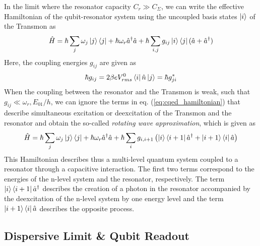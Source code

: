  In the limit where the resonator capacity $C_r \gg C_\Sigma$, we can write the effective Hamiltonian of the qubit-resonator system using the uncoupled basis states $\left| i \right>$ of the Transmon as
%
\begin{equation}
\hat{H} = \hbar \sum\limits_j \omega_j \left| j \right>\left< j \right| + \hbar \omega_r \hat{a}^\dagger \hat{a} + \hbar \sum\limits_{i,j} g_{ij} \left| i \right>\left< j \right|(\hat{a}+\hat{a}^\dagger) \label{eq:cqed_hamiltonian}
\end{equation}
%
Here, the coupling energies $g_{ij}$ are given as
%
\begin{equation}
\hbar g_{ij} = 2\beta e V_{rms}^0 \left< i \right|\hat{n}\left| j \right> = \hbar g_{ji}^*
\end{equation}
%
When the coupling between the resonator and the Transmon is weak, such that $g_{ij} \ll \omega_r,E_{01}/h$, we can ignore the terms in eq. (\ref{eq:cqed_hamiltonian}) that describe simultaneous excitation or deexcitation of the Transmon and the resonator and obtain the so-called {\it rotating wave approximation}, which is given as
%
\begin{equation}
\hat{H} = \hbar \sum\limits_j \omega_j \left| j \right>\left< j \right|+\hbar \omega_r \hat{a}^\dagger \hat{a} + \hbar \sum\limits_i g_{i,i+1}\left(\left| i \right>\left< i+1 \right|\hat{a}^\dagger +\left| i+1 \right>\left< i \right|\hat{a}\right) \label{eq:cqed_rotating_wave}
\end{equation}
%
This Hamiltonian describes thus a multi-level quantum system coupled to a resonator through a capacitive interaction. The first two terms correspond to the energies of the n-level system and the resonator, respectively. The term $\left| i \right>\left< i+1 \right|\hat{a}^\dagger$ describes the creation of a photon in the resonator accompanied by the deexcitation of the n-level system by one energy level and the term $\left| i+1 \right>\left< i \right|\hat{a}$ describes the opposite process.

\subsection{Dispersive Limit \& Qubit Readout}

